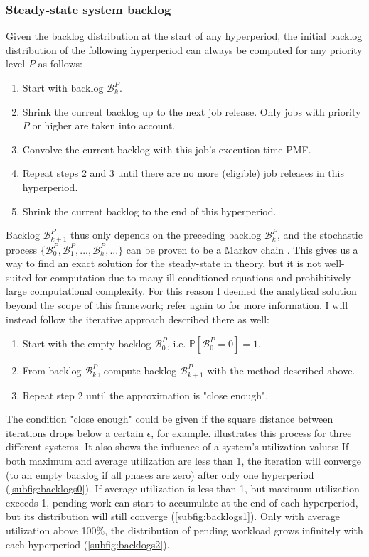 \documentclass[a4paper,oneside]{csthesis}
\begin{document}
\subsubsection{Steady-state system backlog}
\label{subsubsec:stdy-st-blog}
Given the backlog distribution at the start of any hyperperiod, the initial backlog distribution of the following hyperperiod can always be computed for any priority level $P$ as follows:
\begin{enumerate}
    \item Start with backlog $\mathcal{B}_k^P$.
    \item Shrink the current backlog up to the next job release. Only jobs with priority $P$ or higher are taken into account.
    \item Convolve the current backlog with this job's execution time PMF.
    \item Repeat steps 2 and 3 until there are no more (eligible) job releases in this hyperperiod.
    \item Shrink the current backlog to the end of this hyperperiod.
\end{enumerate}

Backlog $\mathcal{B}_{k+1}^P$ thus only depends on the preceding backlog $\mathcal{B}_k^P$, and the stochastic process $\{\mathcal{B}_0^P, \mathcal{B}_1^P, ..., \mathcal{B}_k^P, ...\}$ can be proven to be a Markov chain \cite{diaz2003stochastic}. This gives us a way to find an exact solution for the steady-state in theory, but it is not well-suited for computation due to many ill-conditioned equations and prohibitively large computational complexity. For this reason I deemed the analytical solution beyond the scope of this framework; refer again to \cite{diaz2003stochastic} for more information. I will instead follow the iterative approach described there as well:
\begin{enumerate}
    \item Start with the empty backlog $\mathcal{B}_0^P$, i.e. $\mathbb{P}[\mathcal{B}_0^P = 0] = 1$.
    \item From backlog $\mathcal{B}_k^P$, compute backlog $\mathcal{B}_{k+1}^P$ with the method described above.
    \item Repeat step 2 until the approximation is "close enough".
\end{enumerate}
The condition "close enough" could be given if the square distance between iterations drops below a certain $\epsilon$, for example.  illustrates this process for three different systems. It also shows the influence of a system's utilization values: If both maximum and average utilization are less than 1, the iteration will converge (to an empty backlog if all phases are zero) after only one hyperperiod (\cref{subfig:backlogs0}). If average utilization is less than 1, but maximum utilization exceeds 1, pending work can start to accumulate at the end of each hyperperiod, but its distribution will still converge (\cref{subfig:backlogs1}). Only with average utilization above 100\%, the distribution of pending workload grows infinitely with each hyperperiod (\cref{subfig:backlogs2}).
\end{document}
